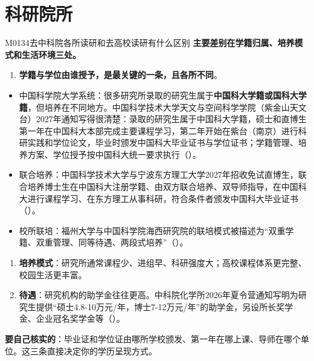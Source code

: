 \section{科研院所}
\begin{qa}{M0134}{去中科院各所读研和去高校读研有什么区别}
\textbf{主要差别在学籍归属、培养模式和生活环境三处。}
\begin{enumerate}
  \item \textbf{学籍与学位由谁授予，是最关键的一条，且各所不同}。
\end{enumerate}
\begin{itemize}
  \item 中国科学院大学系统：很多研究所录取的研究生属于\textbf{中国科大学籍或国科大学籍}，但培养在不同地方。中国科学技术大学天文与空间科学学院（紫金山天文台）2027年通知写得很清楚：录取的研究生属于中国科大学籍，硕士和直博生第一年在中国科大本部完成主要课程学习，第二年开始在紫台（南京）进行科研实践和学位论文，毕业时颁发中国科大毕业证书与学位证书；学籍管理、培养方案、学位授予按中国科大统一要求执行（）。
  \item 联合培养：中国科学技术大学与宁波东方理工大学2027年招收免试直博生，联合培养博士生在中国科大注册学籍、由双方联合培养、双导师指导，在中国科大进行课程学习、在东方理工从事科研，符合条件者颁发中国科大毕业证书（）。
  \item 校所联培：福州大学与中国科学院海西研究院的联培模式被描述为“双重学籍、双重管理、同等待遇、两段式培养”（）。
\end{itemize}
\begin{enumerate}
  \item \textbf{培养模式}：研究所通常课程少、进组早、科研强度大；高校课程体系更完整、校园生活更丰富。
  \item \textbf{待遇}：研究机构的助学金往往更高。中科院化学所2026年夏令营通知写明为研究生提供“硕士4.8-10万元/年，博士7-12万元/年”的助学金，另设所长奖学金、企业冠名奖学金等（）。
\end{enumerate}
\textbf{要自己核实的}：毕业证和学位证由哪所学校颁发、第一年在哪上课、导师在哪个单位。这三条直接决定你的学历呈现方式。
\end{qa}

